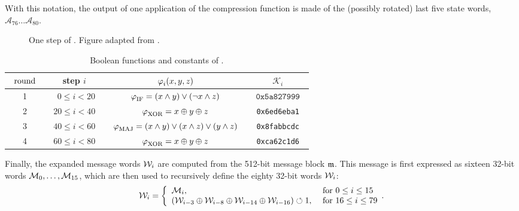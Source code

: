 \noindent
With this notation, the output of one application of the compression function is made of the (possibly rotated) last five state words, $\mathcal{A}_{76}\ldots \mathcal{A}_{80}$.

\begin{figure}[ht]
\begin{center}

\caption{One step of \shaone. Figure adapted from \cite{TiKZ:Cryptographers}.\label{fig:sha1_step}}
\end{center}
\end{figure}


\renewcommand{\arraystretch}{1.2}
\begin{table}[ht]
\caption{\label{tab:sha_spec}Boolean functions and constants of \shaone.}
\begin{center}
\begin{tabular}{c c c c} \toprule
$\;\; \textnormal{round} \;\;$ & step $i$ & $\operatorname{\varphi}_i(x,y,z)$ &  $\mathcal{K}_i$ \\ \midrule
1 & $\;\;  \:\:0 \leq i <  20 \;\;$  & $\operatorname{\varphi}_{\text{IF}} = (x \wedge y) \vee (\neg x \wedge z)$ & $\;\; \texttt{0x5a827999} \;\;$ \\
2 & $20 \leq i <  40$ & $\operatorname{\varphi}_{\text{XOR}} = x \oplus y \oplus z$ & \texttt{0x6ed6eba1} \\
3 & $40 \leq i <  60$ & $\;\;  \operatorname{\varphi}_{\text{MAJ}} = (x \wedge y) \vee (x \wedge z) \vee (y \wedge z) \;\;$  & \texttt{0x8fabbcdc} \\
4 & $60 \leq i <  80$ & $\operatorname{\varphi}_{\text{XOR}} = x \oplus y \oplus z $ & \texttt{0xca62c1d6} \\
\bottomrule
\end{tabular}
\end{center}
\end{table}

\noindent
Finally, the expanded message words $\mathcal{W}_i$ are computed from the 512-bit message block $\mathfrak{m}$. This message is first expressed as
sixteen 32-bit words $\mathcal{M}_0,\ldots, \mathcal{M}_{15}$, which are then used to recursively define the eighty 32-bit words $\mathcal{W}_i$:
\begin{equation}
\label{eq:exp_mess}
\mathcal{W}_i=
\left\{
\begin{array}{ll}
\mathcal{M}_i, & \textnormal{ for } 0\leq i\leq 15 \\
(\mathcal{W}_{i-3} \oplus \mathcal{W}_{i-8} \oplus \mathcal{W}_{i-14} \oplus \mathcal{W}_{i-16}) \circlearrowleft 1, & \textnormal{ for } 16\leq i\leq 79
\end{array}.
\right.
\end{equation}

